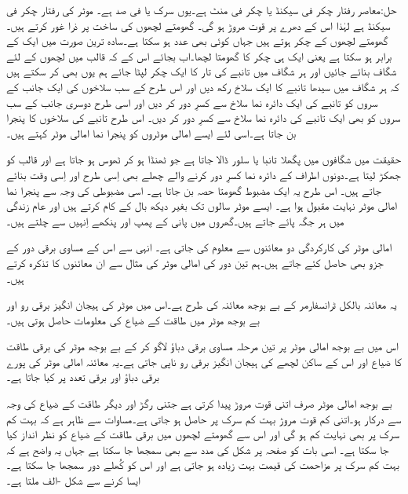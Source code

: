 حل:معاصر رفتار  چکر فی سیکنڈ یا  چکر فی منٹ ہے۔یوں سرک   یا  فی صد ہے۔ موٹر کی رفتار   چکر فی سیکنڈ ہے لہٰذا اس کے  دھرے پر قوت مروڑ   ہو گی۔
%
گھومتے لچھوں کی ساخت پر ذرا غور کرتے ہیں۔ گھومتے لچھوں کے   چکر ہوتے ہیں جہاں  کوئی بھی عدد ہو سکتا ہے۔سادہ ترین صورت میں   ایک کے برابر ہو سکتا ہے یعنی ایک ہی چکر کا گھومتا لچھا۔اب بجائے اس کے کہ قالب میں لچھوں کے لئے شگاف بنائے جائیں اور ہر شگاف میں تانبے کی تار کا ایک چکر لپٹا جائے ہم یوں بھی کر سکتے ہیں کہ ہر شگاف میں سیدھا تانبے کا ایک سلاخ رکھ دیں اور اس طرح کے سب سلاخوں کی ایک جانب کے سروں کو تانبے کی ایک دائرہ نما سلاخ سے کسرِ دور کر دیں اور اسی طرح دوسری جانب کے سب سروں کو بھی ایک تانبے کی دائرہ نما سلاخ سے کسرِ  دور کر دیں۔ اس طرح تانبے کی سلاخوں کا پنجرا بن جاتا ہے۔اسی لئے ایسے امالی موٹروں کو پنجرا نما امالی موٹر کہتے ہیں۔

حقیقت میں شگافوں میں پگھلا تانبا یا سلور  ڈالا جاتا ہے جو ٹھنڈا ہو کر ٹھوس ہو جاتا ہے اور قالب کو جھکڑ لیتا ہے۔دونوں اطراف کے دائرہ نما کسرِ دور کرنے والے چھلے بھی اِسی طرح اور اِسی وقت بنائے جاتے ہیں۔  اس طرح یہ ایک مضبوط گھومتا حصہ بن جاتا ہے۔ اسی مضبوطی کی وجہ سے  پنجرا نما امالی موٹر نہایت مقبول ہوا ہے۔ ایسے موٹر سالوں تک بغیر دیکھ بال کے کام کرتے ہیں اور عام زندگی میں ہر جگہ پائے جاتے ہیں۔گھروں میں پانی کے پمپ اور پنکھے اِنہیں سے چلتے ہیں۔

امالی موٹر کی کارکردگی دو معائنوں سے معلوم کی جاتی ہے۔ انہی سے اس کے مساوی برقی دور کے جزو بھی حاصل کئے جاتے ہیں۔ہم تین دور کی امالی موٹر کی مثال سے ان معائنوں کا تذکرہ کرتے ہیں۔

یہ معائنہ بالکل ٹرانسفارمر کے بے بوجھ معائنہ کی طرح ہے۔اس میں موٹر کی ہیجان انگیز برقی رو اور بے بوجھ موٹر میں طاقت کے ضیاع کی معلومات حاصل ہوتی ہیں۔ 

اس میں  بے بوجھ امالی موٹر پر تین مرحلہ مساوی برقی دباؤ  لاگو کر کے بے بوجھ موٹر کی برقی طاقت کا ضیاع  اور اس کے ساکن لچھے  کی ہیجان انگیز برقی رو  ناپی جاتی ہے۔یہ معائنہ امالی موٹر کی پورے برقی دباؤ اور برقی تعدد پر کیا جاتا ہے۔

بے بوجھ امالی موٹر صرف اتنی قوت مروڑ پیدا کرتی ہے جتنی رگڑ اور دیگر طاقت کے ضیاع کی وجہ سے درکار ہو۔اتنی کم قوت مروڑ بہت کم سرک پر حاصل ہو جاتی ہے۔مساوات   سے ظاہر ہے کہ بہت کم سرک پر   بھی نہایت کم ہو گی  اور اس سے گھومتے لچھوں میں برقی طاقت کے ضیاع کو نظر انداز کیا جا سکتا ہے۔ اسی بات کو صفحہ  پر شکل   کی مدد سے بھی سمجھا جا سکتا ہے جہاں یہ واضح ہے کہ بہت کم سرک پر مزاحمت  کی قیمت بہت زیادہ ہو جاتی ہے اور اس کو کُھلے دور سمجھا جا سکتا ہے۔ایسا کرنے سے شکل -الف ملتا ہے۔

